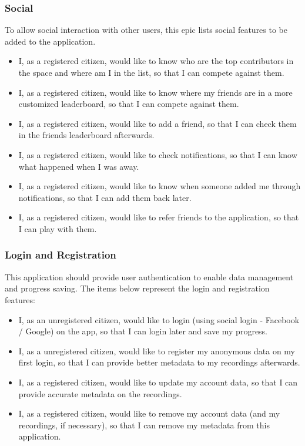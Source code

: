 \subsubsection{Social}

To allow social interaction with other users, this epic lists social features to be added to the application.

\begin{itemize}
    \item I, as a registered citizen, would like to know who are the top contributors in the space and where am I in the list, so that I can compete against them.
    \item I, as a registered citizen, would like to know where my friends are in a more customized leaderboard, so that I can compete against them.
    \item I, as a registered citizen, would like to add a friend, so that I can check them in the friends leaderboard afterwards.
    \item I, as a registered citizen, would like to check notifications, so that I can know what happened when I was away.
    \item I, as a registered citizen, would like to know when someone added me through notifications, so that I can add them back later.
    \item I, as a registered citizen, would like to refer friends to the application, so that I can play with them.
\end{itemize}

\subsubsection{Login and Registration}

This application should provide user authentication to enable data management and progress saving. The items below represent the login and registration features:

\begin{itemize}
    \item I, as an unregistered citizen, would like to login (using social login - Facebook / Google) on the app, so that I can login later and save my progress.
    \item I, as a unregistered citizen, would like to register my anonymous data on my first login, so that I can provide better metadata to my recordings afterwards.
    \item I, as a registered citizen, would like to update my account data, so that I can provide accurate metadata on the recordings.
    \item I, as a registered citizen, would like to remove my account data (and my recordings, if necessary), so that I can remove my metadata from this application.
\end{itemize}

